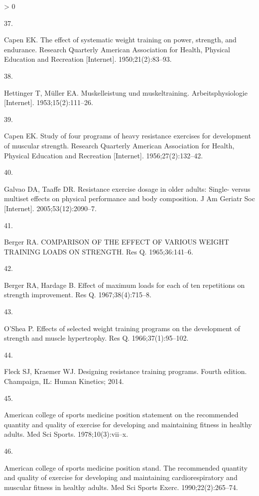 \documentclass[twoside,10pt]{gihclass} %
\newlength{\cslhangindent}
\newlength{\csllabelwidth}
\newenvironment{CSLReferences}[3] %
 {%
  \setlength{\parindent}{0pt}
  \ifodd #1 \everypar{\setlength{\hangindent}{\cslhangindent}}\ignorespaces\fi
  \ifnum #2 > 0
  \setlength{\parskip}{#2\baselineskip}
  \fi
 }%
 {}
\newcommand{\CSLLeftMargin}[1]{\parbox[t]{\maxof{\widthof{#1}}{\csllabelwidth}}{#1}}
\newcommand{\CSLRightInline}[1]{\parbox[t]{\linewidth}{#1}}
\begin{document}
\begin{CSLReferences}{0}{0}
\leavevmode\hypertarget{ref-RN2642}{}%
\CSLLeftMargin{37. }
\CSLRightInline{Capen EK. The effect of systematic weight training on power, strength, and endurance. Research Quarterly American Association for Health, Physical Education and Recreation {[}Internet{]}. 1950;21(2):83--93. }

\leavevmode\hypertarget{ref-RN2645}{}%
\CSLLeftMargin{38. }
\CSLRightInline{Hettinger T, Müller EA. Muskelleistung und muskeltraining. Arbeitsphysiologie {[}Internet{]}. 1953;15(2):111--26. }

\leavevmode\hypertarget{ref-RN1477}{}%
\CSLLeftMargin{39. }
\CSLRightInline{Capen EK. Study of four programs of heavy resistance exercises for development of muscular strength. Research Quarterly American Association for Health, Physical Education and Recreation {[}Internet{]}. 1956;27(2):132--42. }

\leavevmode\hypertarget{ref-RN1472}{}%
\CSLLeftMargin{40. }
\CSLRightInline{Galvao DA, Taaffe DR. Resistance exercise dosage in older adults: Single- versus multiset effects on physical performance and body composition. J Am Geriatr Soc {[}Internet{]}. 2005;53(12):2090--7. }

\leavevmode\hypertarget{ref-RN2659}{}%
\CSLLeftMargin{41. }
\CSLRightInline{Berger RA. COMPARISON OF THE EFFECT OF VARIOUS WEIGHT TRAINING LOADS ON STRENGTH. Res Q. 1965;36:141--6. }

\leavevmode\hypertarget{ref-RN2658}{}%
\CSLLeftMargin{42. }
\CSLRightInline{Berger RA, Hardage B. Effect of maximum loads for each of ten repetitions on strength improvement. Res Q. 1967;38(4):715--8. }

\leavevmode\hypertarget{ref-RN2656}{}%
\CSLLeftMargin{43. }
\CSLRightInline{O'Shea P. Effects of selected weight training programs on the development of strength and muscle hypertrophy. Res Q. 1966;37(1):95--102. }

\leavevmode\hypertarget{ref-RN2537}{}%
\CSLLeftMargin{44. }
\CSLRightInline{Fleck SJ, Kraemer WJ. Designing resistance training programs. Fourth edition. Champaign, IL: Human Kinetics; 2014. }

\leavevmode\hypertarget{ref-RN2655}{}%
\CSLLeftMargin{45. }
\CSLRightInline{American college of sports medicine position statement on the recommended quantity and quality of exercise for developing and maintaining fitness in healthy adults. Med Sci Sports. 1978;10(3):vii--x. }

\leavevmode\hypertarget{ref-RN2654}{}%
\CSLLeftMargin{46. }
\CSLRightInline{American college of sports medicine position stand. The recommended quantity and quality of exercise for developing and maintaining cardiorespiratory and muscular fitness in healthy adults. Med Sci Sports Exerc. 1990;22(2):265--74. }


\end{CSLReferences}
\end{document}
